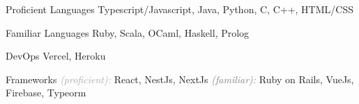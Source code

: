 

\begin{cvskills}

  \cvskill
  {Proficient Languages}
  {Typescript/Javascript, Java, Python, C, C++, HTML/CSS}

  \cvskill
  {Familiar Languages}
  {Ruby, Scala, OCaml, Haskell, Prolog}

  \cvskill
  {DevOps}
  {Vercel, Heroku}

  \cvskill
  {Frameworks}
  {\textcolor{darkgray}{\textit{(proficient):}} React, NestJs, NextJs \textcolor{gray}{\textit{(familiar):}} Ruby on Rails, VueJs, Firebase, Typeorm}

\end{cvskills}
